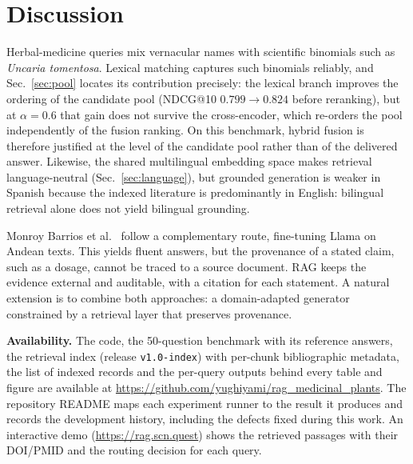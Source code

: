 \documentclass[runningheads]{llncs}
\begin{document}
\section{Discussion}
\label{sec:discussion}

Herbal-medicine queries mix vernacular names with scientific binomials such as \textit{Uncaria tomentosa}. Lexical matching captures such binomials reliably, and Sec.~\ref{sec:pool} locates its contribution precisely: the lexical branch improves the ordering of the candidate pool (NDCG@10 $0.799 \rightarrow 0.824$ before reranking), but at $\alpha{=}0.6$ that gain does not survive the cross-encoder, which re-orders the pool independently of the fusion ranking. On this benchmark, hybrid fusion is therefore justified at the level of the candidate pool rather than of the delivered answer. Likewise, the shared multilingual embedding space makes retrieval language-neutral (Sec.~\ref{sec:language}), but grounded generation is weaker in Spanish because the indexed literature is predominantly in English: bilingual retrieval alone does not yield bilingual grounding.

Monroy Barrios et al.~\cite{monroy2026finetuning} follow a complementary route, fine-tuning Llama on Andean texts. This yields fluent answers, but the provenance of a stated claim, such as a dosage, cannot be traced to a source document. RAG keeps the evidence external and auditable, with a citation for each statement. A natural extension is to combine both approaches: a domain-adapted generator constrained by a retrieval layer that preserves provenance.

\textbf{Availability.} The code, the 50-question benchmark with its reference answers, the retrieval index (release \texttt{v1.0-index}) with per-chunk bibliographic metadata, the list of indexed records and the per-query outputs behind every table and figure are available at \url{https://github.com/yughiyami/rag_medicinal_plants}. The repository README maps each experiment runner to the result it produces and records the development history, including the defects fixed during this work. An interactive demo (\url{https://rag.scn.quest}) shows the retrieved passages with their DOI/PMID and the routing decision for each query.
\end{document}
